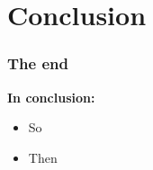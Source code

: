 \section{Conclusion}

\begin{frame}
    \frametitle{The end}

    \textbf{In conclusion:}
    \begin{itemize}
        \item So\pause
        \item Then
    \end{itemize}
\end{frame}